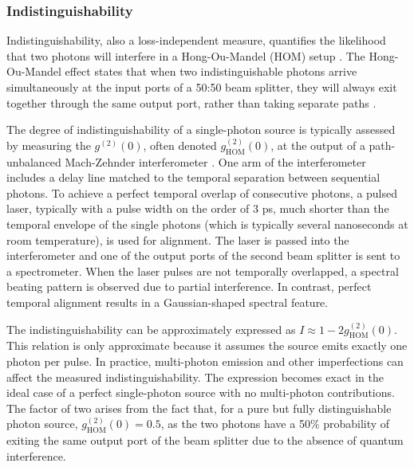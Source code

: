 \subsubsection{Indistinguishability}

Indistinguishability, also a loss-independent measure, quantifies the likelihood that two photons will interfere in a Hong-Ou-Mandel (HOM) setup \cite{Hong1987}. The Hong-Ou-Mandel effect states that when two indistinguishable photons arrive simultaneously at the input ports of a 50:50 beam splitter, they will always exit together through the same output port, rather than taking separate paths \cite{Hong1987}.

The degree of indistinguishability of a single-photon source is typically assessed by measuring the $g^{(2)}(0)$, often denoted $g^{(2)}_{\text{HOM}}(0)$, at the output of a path-unbalanced Mach-Zehnder interferometer \cite{Rarity2024}. One arm of the interferometer includes a delay line matched to the temporal separation between sequential photons. To achieve a perfect temporal overlap of consecutive photons, a pulsed laser, typically with a pulse width on the order of 3 ps, much shorter than the temporal envelope of the single photons (which is typically several nanoseconds at room temperature), is used for alignment. The laser is passed into the interferometer and one of the output ports of the second beam splitter is sent to a spectrometer. When the laser pulses are not temporally overlapped, a spectral beating pattern is observed due to partial interference. In contrast, perfect temporal alignment results in a Gaussian-shaped spectral feature.

The indistinguishability can be approximately expressed as $ I \approx 1 - 2g^{(2)}_{\text{HOM}}(0) $. This relation is only approximate because it assumes the source emits exactly one photon per pulse. In practice, multi-photon emission and other imperfections can affect the measured indistinguishability. The expression becomes exact in the ideal case of a perfect single-photon source with no multi-photon contributions. The factor of two arises from the fact that, for a pure but fully distinguishable photon source, $ g^{(2)}_{\text{HOM}}(0) = 0.5 $, as the two photons have a 50\% probability of exiting the same output port of the beam splitter due to the absence of quantum interference. 


